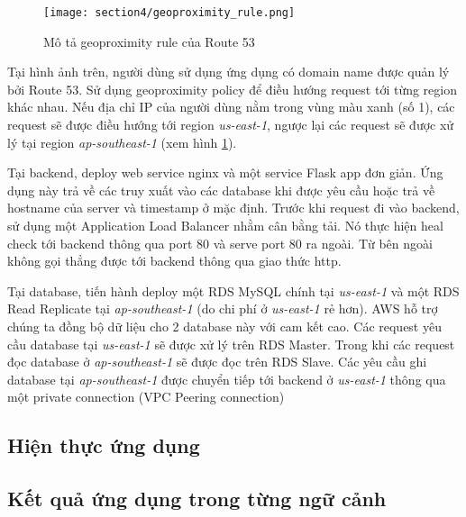 \begin{figure}
    \centering
    \texttt{[image: section4/geoproximity\_rule.png]}
    \caption{Mô tả geoproximity rule của Route 53}
    \label{fig:sec4-geoproximity_rule}
\end{figure}

Tại hình ảnh trên, người dùng sử dụng ứng dụng có domain name được quản lý bởi Route 53. Sử dụng geoproximity policy để điều hướng request tới từng region khác nhau. Nếu địa chỉ IP của người dùng nằm trong vùng màu xanh (số 1), các request sẽ được điều hướng tới region \textit{us-east-1}, ngược lại các request sẽ được xử lý tại region \textit{ap-southeast-1} (xem hình \ref{fig:sec4-geoproximity_rule}).

Tại backend, deploy web service nginx và một service Flask app đơn giản. Ứng dụng này trả về các truy xuất vào các database khi được yêu cầu hoặc trả về hostname của server và timestamp ở mặc định. Trước khi request đi vào backend, sử dụng một Application Load Balancer nhằm cân bằng tải. Nó thực hiện heal check tới backend thông qua port 80 và serve port 80 ra ngoài. Từ bên ngoài không gọi thẳng được tới backend thông qua giao thức http.

Tại database, tiến hành deploy một RDS MySQL chính tại \textit{us-east-1} và một RDS Read Replicate tại \textit{ap-southeast-1} (do chi phí ở \textit{us-east-1} rẻ hơn). AWS hỗ trợ chúng ta đồng bộ dữ liệu cho 2 database này với cam kết cao. Các request yêu cầu database tại \textit{us-east-1} sẽ được xử lý trên RDS Master. Trong khi các request đọc database ở \textit{ap-southeast-1} sẽ được đọc trên RDS Slave. Các yêu cầu ghi database tại \textit{ap-southeast-1} được chuyển tiếp tới backend ở \textit{us-east-1} thông qua một private connection (VPC Peering connection)

\subsection{Hiện thực ứng dụng}



\subsection{Kết quả ứng dụng trong từng ngữ cảnh}